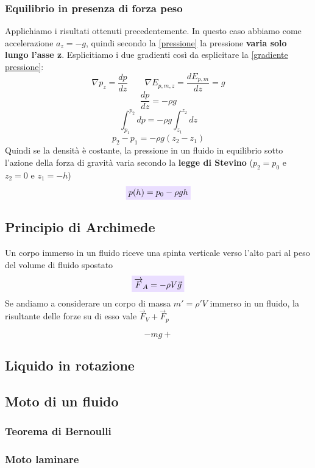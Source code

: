 \documentclass[x11names]{article}
\newcommand{\viola}[1]{\colorbox{myred}{$\displaystyle #1$}}
\begin{document}
	\subsubsection{Equilibrio in presenza di forza peso}
	Applichiamo i risultati ottenuti precedentemente. In questo caso abbiamo come accelerazione \(a_z = -g\), quindi secondo la \ref{pressione} la pressione \textbf{varia solo lungo l'asse z}. Esplicitiamo i due gradienti così da esplicitare la \ref{gradiente pressione}:
	\[ 
	\boxed{\nabla p_z = \frac{d p}{d z} }\qquad \boxed{\nabla E_{p,m,z} = \frac{d E_{p,m}}{d z} = g}
	\]
	\[ 
	\frac{dp}{dz} = -\rho g
	\]
	\[ 
	\int_{p_1}^{p_2}dp = -\rho g \int_{z_1}^{z_2}dz
	\]
	\[ 
	p_2 - p_1 = -\rho g (z_2 - z_1)
	\]
	Quindi se la densità è costante, la pressione in un fluido in equilibrio sotto l'azione della forza di gravità varia secondo la \textbf{legge di Stevino }(\(p_2 = p_0\) e \(z_2 = 0\) e \(z_1 = -h\))
	\begin{equation}\label{stevino}
		\viola{ p(h) = p_0 -\rho g h}
	\end{equation}
	
	\subsection{Principio di Archimede}
	Un corpo immerso in un fluido riceve una spinta verticale verso l'alto  pari al peso del volume di fluido spostato
	\begin{equation}
	\viola{	\overrightarrow{F}_A = -\rho V \vec{g}}
	\end{equation}
	Se andiamo a considerare un corpo di massa \(m' = \rho'V\) immerso in un fluido, la risultante delle forze su di esso vale \(\overrightarrow{F}_V + \overrightarrow{F}_p\)

	\[ 
	-mg + 
	\]
	
	
	
	\subsection{Liquido in rotazione}
	\subsection{Moto  di un fluido}
		\subsubsection{Teorema di Bernoulli}
		\subsubsection{Moto laminare}
\end{document}
